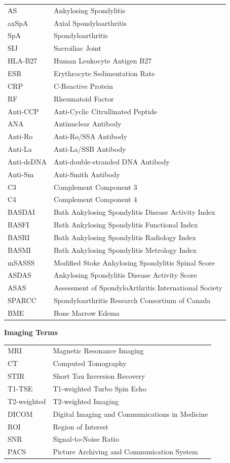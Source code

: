 \documentclass[12pt, a4paper]{article}
\begin{document}
\begin{tabular}{ll}
AS & Ankylosing Spondylitis \\
axSpA & Axial Spondyloarthritis \\
SpA & Spondyloarthritis \\
SIJ & Sacroiliac Joint \\
HLA-B27 & Human Leukocyte Antigen B27 \\
ESR & Erythrocyte Sedimentation Rate \\
CRP & C-Reactive Protein \\
RF & Rheumatoid Factor \\
Anti-CCP & Anti-Cyclic Citrullinated Peptide \\
ANA & Antinuclear Antibody \\
Anti-Ro & Anti-Ro/SSA Antibody \\
Anti-La & Anti-La/SSB Antibody \\
Anti-dsDNA & Anti-double-stranded DNA Antibody \\
Anti-Sm & Anti-Smith Antibody \\
C3 & Complement Component 3 \\
C4 & Complement Component 4 \\
BASDAI & Bath Ankylosing Spondylitis Disease Activity Index \\
BASFI & Bath Ankylosing Spondylitis Functional Index \\
BASRI & Bath Ankylosing Spondylitis Radiology Index \\
BASMI & Bath Ankylosing Spondylitis Metrology Index \\
mSASSS & Modified Stoke Ankylosing Spondylitis Spinal Score \\
ASDAS & Ankylosing Spondylitis Disease Activity Score \\
ASAS & Assessment of SpondyloArthritis International Society \\
SPARCC & Spondyloarthritis Research Consortium of Canada \\
BME & Bone Marrow Edema \\
\end{tabular}

\vspace{0.5cm}
\textbf{Imaging Terms}

\begin{tabular}{ll}
MRI & Magnetic Resonance Imaging \\
CT & Computed Tomography \\
STIR & Short Tau Inversion Recovery \\
T1-TSE & T1-weighted Turbo Spin Echo \\
T2-weighted & T2-weighted Imaging \\
DICOM & Digital Imaging and Communications in Medicine \\
ROI & Region of Interest \\
SNR & Signal-to-Noise Ratio \\
PACS & Picture Archiving and Communication System \\
\end{tabular}
\end{document}
